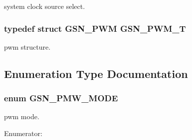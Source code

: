 system clock source select. 

\hypertarget{a00650_gad6886352df79f09ac5070d71f1117f7f}{
\subsubsection[{GSN\_\-PWM\_\-T}]{\setlength{\rightskip}{0pt plus 5cm}typedef struct {\bf GSN\_\-PWM}  {\bf GSN\_\-PWM\_\-T}}}
\label{a00650_gad6886352df79f09ac5070d71f1117f7f}


pwm structure. 



\subsection{Enumeration Type Documentation}
\hypertarget{a00650_ga2ce321cf068e815e8a30642d73f1bdd4}{
\subsubsection[{GSN\_\-PMW\_\-MODE}]{\setlength{\rightskip}{0pt plus 5cm}enum {\bf GSN\_\-PMW\_\-MODE}}}
\label{a00650_ga2ce321cf068e815e8a30642d73f1bdd4}


pwm mode. 

\begin{Desc}
\item[Enumerator: ]\par
\begin{description}
\item[{\em 
\hypertarget{a00650_gga2ce321cf068e815e8a30642d73f1bdd4a53c59d2f203c604754f20a6b7ec71555}{
GSN\_\-PWM\_\-MODE\_\-INDIVIDUAl}
\label{a00650_gga2ce321cf068e815e8a30642d73f1bdd4a53c59d2f203c604754f20a6b7ec71555}
}]\item[{\em 
\hypertarget{a00650_gga2ce321cf068e815e8a30642d73f1bdd4a7a23dfc92d04b1e2f8fc60ea8579453b}{
GSN\_\-PWM\_\-MODE\_\-SYNCHRONIZED}
\label{a00650_gga2ce321cf068e815e8a30642d73f1bdd4a7a23dfc92d04b1e2f8fc60ea8579453b}
}]\end{description}
\end{Desc}



